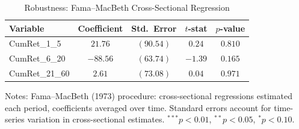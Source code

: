 \begin{table}[htbp]\centering
\caption{Robustness: Fama--MacBeth Cross-Sectional Regression}
\label{tab:fama_macbeth}
\begin{tabular}{lcccc}
\toprule
Variable & Coefficient & Std.\ Error & $t$-stat & $p$-value \\
\midrule
CumRet\_1\_5 & $21.76$ & $(90.54)$ & $0.24$ & $0.810$ \\
CumRet\_6\_20 & $-88.56$ & $(63.74)$ & $-1.39$ & $0.165$ \\
CumRet\_21\_60 & $2.61$ & $(73.08)$ & $0.04$ & $0.971$ \\
\bottomrule
\end{tabular}
\begin{tablenotes}\small
\item Notes: Fama--MacBeth (1973) procedure: cross-sectional regressions
estimated each period, coefficients averaged over time. Standard errors
account for time-series variation in cross-sectional estimates.
$^{***}p<0.01$, $^{**}p<0.05$, $^{*}p<0.10$.
\end{tablenotes}
\end{table}